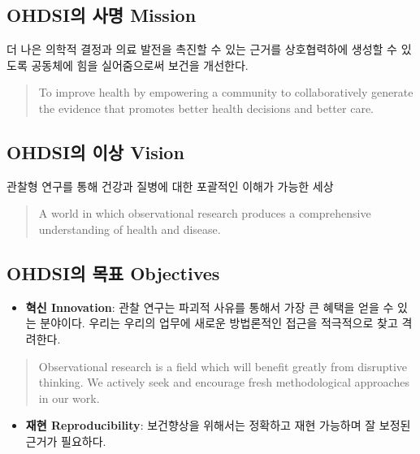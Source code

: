\documentclass[10.5pt]{book}
\providecommand{\tightlist}{%
  \setlength{\itemsep}{0pt}\setlength{\parskip}{0pt}}
\theoremstyle{definition}
\theoremstyle{definition}
\theoremstyle{definition}
\theoremstyle{remark}
\begin{document}
\subsection{OHDSI의 사명 Mission}\label{ohdsi--mission}

더 나은 의학적 결정과 의료 발전을 촉진할 수 있는 근거를 상호협력하에
생성할 수 있도록 공동체에 힘을 실어줌으로써 보건을 개선한다.

\begin{quote}
To improve health by empowering a community to collaboratively generate
the evidence that promotes better health decisions and better care.
\end{quote}

\subsection{OHDSI의 이상 Vision}\label{ohdsi--vision}

관찰형 연구를 통해 건강과 질병에 대한 포괄적인 이해가 가능한 세상

\begin{quote}
A world in which observational research produces a comprehensive
understanding of health and disease. 
\end{quote}

\subsection{OHDSI의 목표 Objectives}\label{ohdsi--objectives}

\begin{itemize}
\tightlist
\item
  \textbf{혁신 Innovation}: 관찰 연구는 파괴적 사유를 통해서 가장 큰
  혜택을 얻을 수 있는 분야이다. 우리는 우리의 업무에 새로운 방법론적인
  접근을 적극적으로 찾고 격려한다.
\end{itemize}

\begin{quote}
Observational research is a field which will benefit greatly from
disruptive thinking. We actively seek and encourage fresh methodological
approaches in our work.
\end{quote}

\begin{itemize}
\tightlist
\item
  \textbf{재현 Reproducibility}: 보건향상을 위해서는 정확하고 재현
  가능하며 잘 보정된 근거가 필요하다.
\end{itemize}
\end{document}
